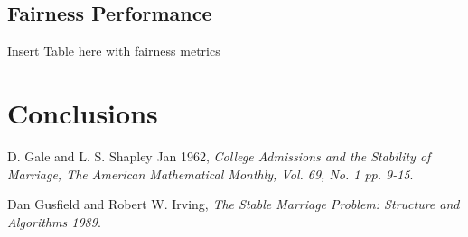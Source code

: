 \documentclass[a4paper]{article}
\begin{document}
\subsection{Fairness Performance}

Insert Table here with fairness metrics

\section{Conclusions}

\begin{thebibliography}{9}
  D. Gale and L. S. Shapley Jan 1962,
  \emph{College Admissions and the Stability of Marriage, The American Mathematical Monthly, Vol. 69, No. 1 pp. 9-15}.

  Dan Gusfield and Robert W. Irving,
  \emph{The Stable Marriage Problem: Structure and Algorithms 1989}.

\end{thebibliography}
\end{document}
